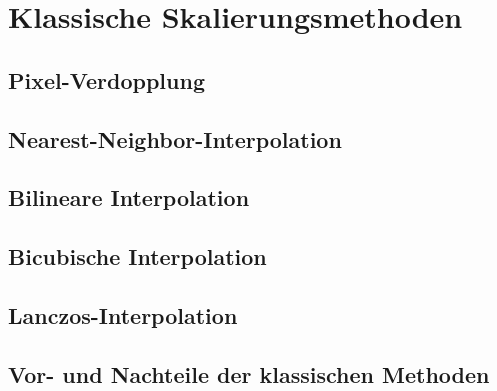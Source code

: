 
\chapter{Klassische Skalierungsmethoden}

    \section{Pixel-Verdopplung}
    \section{Nearest-Neighbor-Interpolation}
    \section{Bilineare Interpolation}
    \section{Bicubische Interpolation}
    \section{Lanczos-Interpolation}
    \section{Vor- und Nachteile der klassischen Methoden}